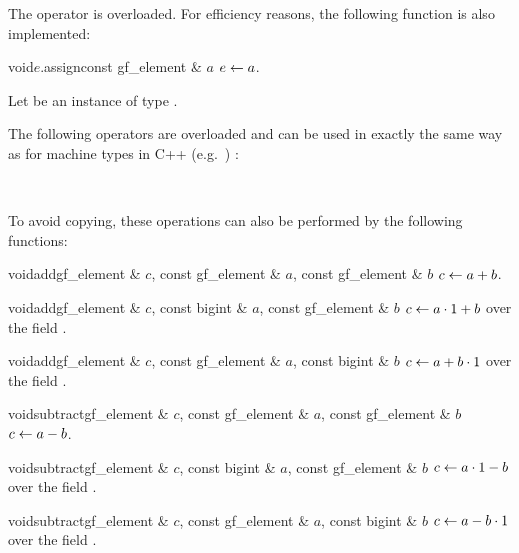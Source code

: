 The operator \code{=} is overloaded.  For efficiency reasons, the following function is also
implemented:

\begin{fcode}{void}{$e$.assign}{const gf_element & $a$}
  $e \leftarrow a$.
\end{fcode}



\ARTH

Let  be an instance of type .

The following operators are overloaded and can be used in exactly the same way as for machine
types in C++ (e.g.~) :

\begin{center}
  \\
\end{center}

To avoid copying, these operations can also be performed by the following functions:

\begin{fcode}{void}{add}{gf_element & $c$, const gf_element & $a$, const gf_element & $b$}
  $c \leftarrow a + b$.
\end{fcode}

\begin{fcode}{void}{add}{gf_element & $c$, const bigint & $a$, const gf_element & $b$}
  $c \leftarrow a \cdot 1 + b$ over the field .
\end{fcode}

\begin{fcode}{void}{add}{gf_element & $c$, const gf_element & $a$, const bigint & $b$}
  $c \leftarrow a + b \cdot 1$ over the field .
\end{fcode}

\begin{fcode}{void}{subtract}{gf_element & $c$, const gf_element & $a$, const gf_element & $b$}
  $c \leftarrow a - b$.
\end{fcode}

\begin{fcode}{void}{subtract}{gf_element & $c$, const bigint & $a$, const gf_element & $b$}
  $c \leftarrow a \cdot 1 - b$ over the field .
\end{fcode}

\begin{fcode}{void}{subtract}{gf_element & $c$, const gf_element & $a$, const bigint & $b$}
  $c \leftarrow a - b \cdot 1$ over the field .
\end{fcode}

